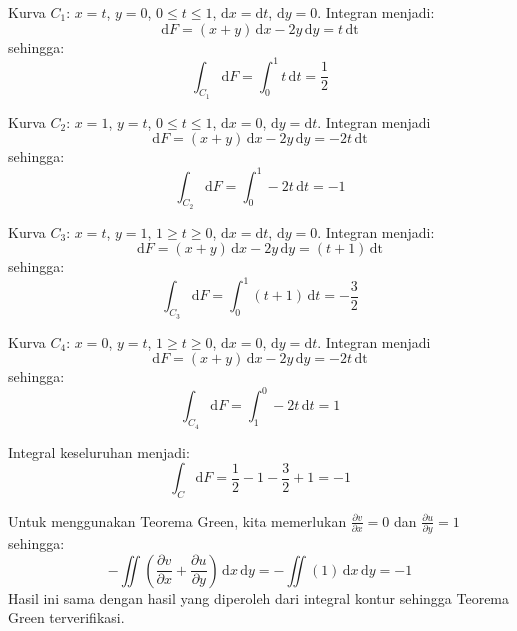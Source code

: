 Kurva $C_1$: $x = t$, $y = 0$, $0 \leq t \leq 1$, $\mathrm{d}x = \mathrm{d}t$,
$\mathrm{d}y = 0$. Integran menjadi:
\begin{equation*}
\mathrm{d}F = (x + y)\,\mathrm{d}x - 2y\,\mathrm{d}y = t\,\mathrm{dt}
\end{equation*}
sehingga:
\begin{equation*}
\int_{C_1} \mathrm{d}F = \int_{0}^{1} t\,\mathrm{d}t = \frac{1}{2}
\end{equation*}

Kurva $C_2$: $x = 1$, $y = t$, $0 \leq t \leq 1$, $\mathrm{d}x = 0$,
$\mathrm{d}y = \mathrm{d}t$. Integran menjadi
\begin{equation*}
\mathrm{d}F = (x + y)\,\mathrm{d}x - 2y\,\mathrm{d}y = -2t\,\mathrm{dt}
\end{equation*}
sehingga:
\begin{equation*}
\int_{C_2} \mathrm{d}F = \int_{0}^{1} -2t\,\mathrm{d}t = -1
\end{equation*}

Kurva $C_3$: $x = t$, $y = 1$, $1 \geq t \geq 0$, $\mathrm{d}x = \mathrm{d}t$,
$\mathrm{d}y = 0$. Integran menjadi:
\begin{equation*}
\mathrm{d}F = (x + y)\,\mathrm{d}x - 2y\,\mathrm{d}y = (t + 1)\,\mathrm{dt}
\end{equation*}
sehingga:
\begin{equation*}
\int_{C_3} \mathrm{d}F = \int_{0}^{1} (t + 1) \,\mathrm{d}t = -\frac{3}{2}
\end{equation*}


Kurva $C_4$: $x = 0$, $y = t$, $1 \geq t \geq 0$, $\mathrm{d}x = 0$,
$\mathrm{d}y = \mathrm{d}t$. Integran menjadi
\begin{equation*}
\mathrm{d}F = (x + y)\,\mathrm{d}x - 2y\,\mathrm{d}y = -2t\,\mathrm{dt}
\end{equation*}
sehingga:
\begin{equation*}
\int_{C_4} \mathrm{d}F = \int_{1}^{0} -2t\,\mathrm{d}t = 1
\end{equation*}

Integral keseluruhan menjadi:
\begin{equation*}
\int_{C} \mathrm{d}F = \frac{1}{2} - 1 - \frac{3}{2} + 1 = -1
\end{equation*}

Untuk menggunakan Teorema Green, kita memerlukan $\frac{\partial v}{\partial x} = 0$
dan $\frac{\partial u}{\partial y} = 1$ sehingga:
\begin{equation*}
-\iint \left(\frac{\partial v}{\partial x} + \frac{\partial u}{\partial y} \right)
\,\mathrm{d}x\,\mathrm{d}y = -\iint (1)\,\mathrm{d}x\,\mathrm{d}y = -1
\end{equation*}
Hasil ini sama dengan hasil yang diperoleh dari integral kontur sehingga
Teorema Green terverifikasi.


